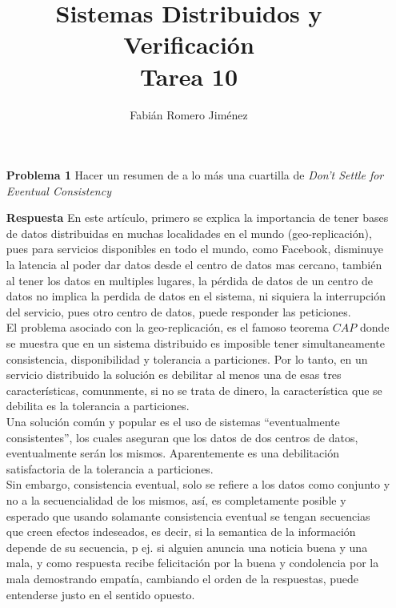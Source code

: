 \documentclass{article}
\title{Sistemas Distribuidos y Verificación \\ Tarea 10}
\author{Fabián Romero Jiménez}
\date{}
\begin{document}
\maketitle

\begin{enumerate}

\item[\bf{Problema 1}] Hacer un resumen de a lo más una cuartilla de {\it Don’t Settle for Eventual Consistency}

\item[\bf{Respuesta}]
En este artículo, primero se explica la importancia de tener bases de datos distribuidas en muchas localidades en el mundo (geo-replicación), pues para servicios disponibles en todo el mundo, como Facebook, disminuye la latencia al poder dar datos desde el centro de datos mas cercano, también al tener los datos en multiples lugares, la pérdida de datos de un centro de datos no implica la perdida de datos en el sistema, ni siquiera la interrupción del servicio, pues otro centro de datos, puede responder las peticiones.\\

El problema asociado con la geo-replicación, es el famoso teorema $CAP$ donde se muestra que en un sistema distribuido es imposible tener simultaneamente consistencia, disponibilidad y tolerancia a particiones. Por lo tanto, en un servicio distribuido la solución es debilitar al menos una de esas tres características, comunmente, si no se trata de dinero, la característica que se debilita es la tolerancia a particiones.\\

Una solución común y popular es el uso de sistemas ``eventualmente consistentes'', los cuales aseguran que los datos de dos centros de datos, eventualmente serán los mismos. Aparentemente es una debilitación satisfactoria de la tolerancia a particiones.\\

Sin embargo, consistencia eventual, solo se refiere a los datos como conjunto y no a la secuencialidad de los mismos, así, es completamente posible y esperado que usando solamante consistencia eventual se tengan secuencias que creen efectos indeseados, es decir, si la semantica de la información depende de su secuencia, p ej. si alguien anuncia una noticia buena y una mala, y como respuesta recibe felicitación por la buena y condolencia por la mala demostrando empatía, cambiando el orden de la respuestas, puede entenderse justo en el sentido opuesto.\\


\end{enumerate}
\end{document}
